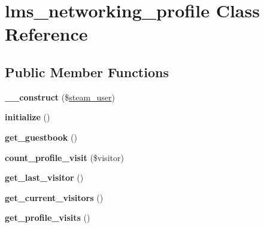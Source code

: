 \hypertarget{classlms__networking__profile}{
\section{lms\_\-networking\_\-profile Class Reference}
\label{classlms__networking__profile}
}
\subsection*{Public Member Functions}
\begin{DoxyCompactItemize}
\item 
\hypertarget{classlms__networking__profile_a60d441c5c1dbb6485158e509e62db25e}{
{\bfseries \_\-\_\-construct} (\$\hyperlink{classsteam__user}{steam\_\-user})}
\label{classlms__networking__profile_a60d441c5c1dbb6485158e509e62db25e}

\item 
\hypertarget{classlms__networking__profile_ac7834a66b1321aa14ac1dbd473f9874b}{
{\bfseries initialize} ()}
\label{classlms__networking__profile_ac7834a66b1321aa14ac1dbd473f9874b}

\item 
\hypertarget{classlms__networking__profile_ad2e18014be6343daf683559078bf4eb2}{
{\bfseries get\_\-guestbook} ()}
\label{classlms__networking__profile_ad2e18014be6343daf683559078bf4eb2}

\item 
\hypertarget{classlms__networking__profile_aa731e3caa1e78f155178e3803ee47702}{
{\bfseries count\_\-profile\_\-visit} (\$visitor)}
\label{classlms__networking__profile_aa731e3caa1e78f155178e3803ee47702}

\item 
\hypertarget{classlms__networking__profile_a05000b10f102652923c291289400c155}{
{\bfseries get\_\-last\_\-visitor} ()}
\label{classlms__networking__profile_a05000b10f102652923c291289400c155}

\item 
\hypertarget{classlms__networking__profile_a5bf39897e134dc56119a1b47a50e08b1}{
{\bfseries get\_\-current\_\-visitors} ()}
\label{classlms__networking__profile_a5bf39897e134dc56119a1b47a50e08b1}

\item 
\hypertarget{classlms__networking__profile_af18e4dffaa30911f8e3ebcea60f8b90e}{
{\bfseries get\_\-profile\_\-visits} ()}
\label{classlms__networking__profile_af18e4dffaa30911f8e3ebcea60f8b90e}

\end{DoxyCompactItemize}

